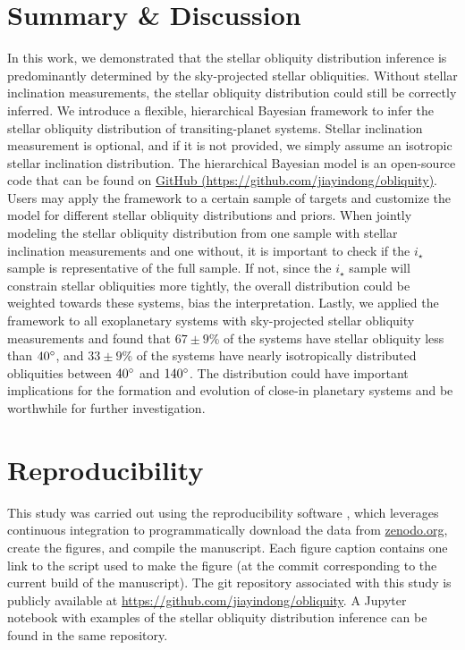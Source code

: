 \documentclass[twocolumn,times]{aastex631}
\begin{document}
\section{Summary \& Discussion}

In this work, we demonstrated that the stellar obliquity distribution inference is predominantly determined by the sky-projected stellar obliquities. Without stellar inclination measurements, the stellar obliquity distribution could still be correctly inferred.
We introduce a flexible, hierarchical Bayesian framework to infer the stellar obliquity distribution of transiting-planet systems. Stellar inclination measurement is optional, and if it is not provided, we simply assume an isotropic stellar inclination distribution. The hierarchical Bayesian model is an open-source code that can be found on \href{https://github.com/jiayindong/obliquity}{GitHub\,\faGithub\,(https://github.com/jiayindong/obliquity)}. Users may apply the framework to a certain sample of targets and customize the model for different stellar obliquity distributions and priors.
When jointly modeling the stellar obliquity distribution from one sample with stellar inclination measurements and one without, it is important to check if the $i_\star$ sample is representative of the full sample. If not, since the $i_\star$ sample will constrain stellar obliquities more tightly, the overall distribution could be weighted towards these systems, bias the interpretation.
Lastly, we applied the framework to all exoplanetary systems with sky-projected stellar obliquity measurements and found that $67\pm9$\% of the systems have stellar obliquity less than $40\mbox{$^\circ$}$, and $33\pm9$\% of the systems have nearly isotropically distributed obliquities between $40\mbox{$^\circ$}$ and $140\mbox{$^\circ$}$.
The distribution could have important implications for the formation and evolution of close-in planetary systems and be worthwhile for further investigation.

\section{Reproducibility}\label{sec:reproducibility}
This study was carried out using the reproducibility software \href{https://github.com/showyourwork/showyourwork}{\showyourwork} \citep{Luger2021}, which leverages continuous integration to programmatically download the data from \href{https://zenodo.org/}{zenodo.org}, create the figures, and compile the manuscript. 
Each figure caption contains one link to the script used to make the figure (at the commit corresponding to the current build of the manuscript).
The git repository associated with this study is publicly available at \url{https://github.com/jiayindong/obliquity}.
A Jupyter notebook with examples of the stellar obliquity distribution inference can be found in the same repository.
\end{document}
